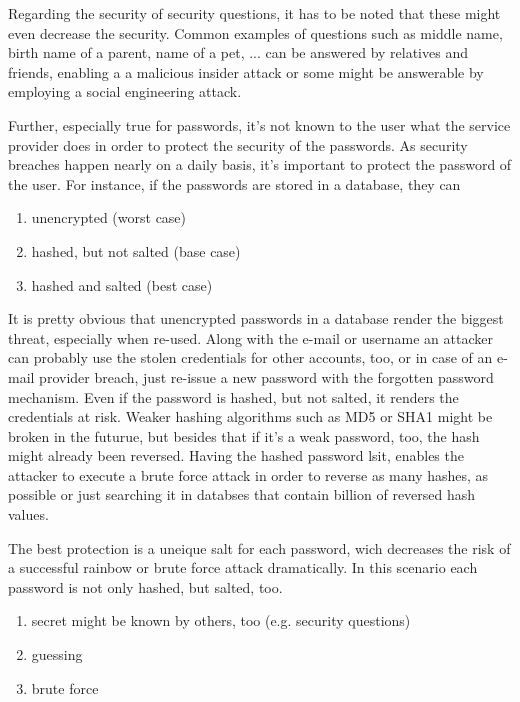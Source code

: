Regarding the security of security questions, it has to be noted that these might even decrease the security. Common examples of questions such as \frqq middle name, birth name of a parent, name of a pet, ...\flqq{} can be answered by relatives and friends, enabling a a malicious insider attack or some might be answerable by employing a social engineering attack.

Further, especially true for passwords, it's not known to the user what the service provider does in order to protect the security of the passwords. As security breaches happen nearly on a daily basis, it's important to protect the password of the user. For instance, if the passwords are stored in a database, they can

\begin{enumerate}[label=(\alph*)]
	\item unencrypted (worst case)
	\item hashed, but not salted (base case)
	\item hashed and salted (best case)
\end{enumerate}

It is pretty obvious that unencrypted passwords in a database render the biggest threat, especially when re-used. Along with the e-mail or username an attacker can probably use the stolen credentials for other accounts, too, or in case of an e-mail provider breach, just re-issue a new password with the \flqq forgotten password \frqq{} mechanism. Even if the password is hashed, but not salted, it renders the credentials at risk. Weaker hashing algorithms such as MD5 or SHA1 might be broken in the futurue, but besides that if it's a weak password, too, the hash might already been reversed. Having the hashed password lsit, enables the attacker to execute a brute force attack in order to reverse as many hashes, as possible or just searching it in databses that contain billion of reversed hash values.

The best protection is a uneique salt for each password, wich decreases the risk of a successful rainbow or brute force attack dramatically. In this scenario each password is not only hashed, but salted, too.

\begin{enumerate}
	\item secret might be known by others, too (e.g. security questions)
	\item guessing
	\item brute force
\end{enumerate}


